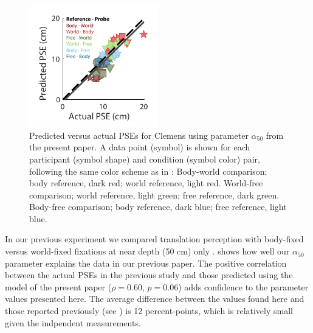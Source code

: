 \begin{figure}
    \includegraphics[width=0.5\textwidth]{src/paper4/p4_figure6.pdf}

    \caption{Predicted versus actual PSEs for Clemens \protect\citeyear{clemens2015a} using parameter $\alpha_{50}$ from the present paper. A data point (symbol) is shown for each participant (symbol shape) and condition (symbol color) pair, following the same color scheme as in \protect{}: Body-world comparison; body reference, dark red; world reference, light red. World-free comparison; world reference, light green; free reference, dark green. Body-free comparison; body reference, dark blue; free reference, light blue.}
    \label{p4:fig6}
\end{figure}

In our previous experiment we compared translation perception with body-fixed versus world-fixed fixations at near depth (50 \si{\centi\metre}) only \cite{clemens2015a}.  shows how well our $\alpha_{50}$ parameter explains the data in our previous paper. The positive correlation between the actual PSEs in the previous study and those predicted using the model of the present paper ($\rho = 0.60$, $p = 0.06$) adds confidence to the parameter values presented here. The average difference between the values found here and those reported previously (see ) is 12  percent-points, which is relatively small given the indpendent measurements.

